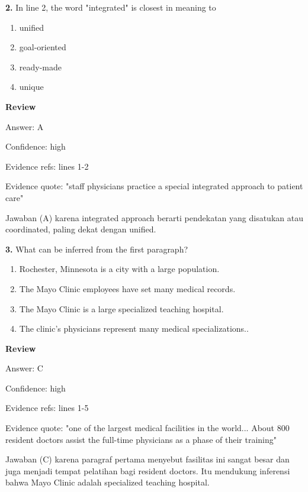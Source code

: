\documentclass[12pt]{article}
\begin{document}
\noindent\textbf{2.} In line 2, the word "integrated" is closest in meaning to
\begin{enumerate}[label=(\Alph*),leftmargin=*,itemsep=0.2em]
\item unified
\item goal-oriented
\item ready-made
\item unique
\end{enumerate}
\par
\begingroup
\setlength{\parskip}{0pt}
\setlength{\parindent}{0pt}
\textbf{Review}\par
Answer: A\par
Confidence: high\par
Evidence refs: lines 1-2\par
Evidence quote: "staff physicians practice a special integrated approach to patient care"\par
Jawaban (A) karena integrated approach berarti pendekatan yang disatukan atau coordinated, paling dekat dengan unified.\par
\endgroup
\par
\vspace{0.25\baselineskip}
\noindent\textbf{3.} What can be inferred from the first paragraph?
\begin{enumerate}[label=(\Alph*),leftmargin=*,itemsep=0.2em]
\item Rochester, Minnesota is a city with a large population.
\item The Mayo Clinic employees have set many medical records.
\item The Mayo Clinic is a large specialized teaching hospital.
\item The clinic's physicians represent many medical specializations..
\end{enumerate}
\par
\begingroup
\setlength{\parskip}{0pt}
\setlength{\parindent}{0pt}
\textbf{Review}\par
Answer: C\par
Confidence: high\par
Evidence refs: lines 1-5\par
Evidence quote: "one of the largest medical facilities in the world... About 800 resident doctors assist the full-time physicians as a phase of their training"\par
Jawaban (C) karena paragraf pertama menyebut fasilitas ini sangat besar dan juga menjadi tempat pelatihan bagi resident doctors. Itu mendukung inferensi bahwa Mayo Clinic adalah specialized teaching hospital.\par
\end{document}
